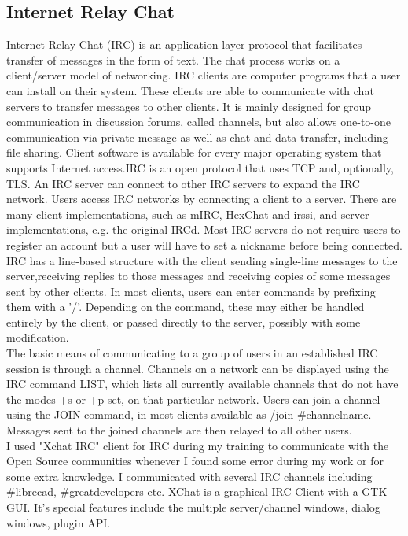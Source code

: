 \subsection{Internet Relay Chat}
Internet Relay Chat (IRC) is an application layer protocol that facilitates transfer of messages in the form of text. The chat process works on a client/server model of networking. IRC clients are computer programs that a user can install on their system. These clients are able to communicate with chat servers to transfer messages to other clients. It is mainly designed for group communication in discussion forums, called channels, but also allows one-to-one communication via private message as well as chat and data transfer, including file sharing.
Client software is available for every major operating system that supports Internet access.IRC is an open protocol that uses TCP and, optionally, TLS. An IRC server can connect to other IRC servers to expand the IRC network. Users access IRC networks by connecting a client to a server. There are many client implementations, such as mIRC, HexChat and irssi, and server implementations, e.g. the original IRCd. Most IRC servers do not require users to register an account but a user will have to set a nickname before being connected.\\

IRC has a line-based structure with the client sending single-line messages to the server,receiving replies to those messages and receiving copies of some messages sent by other clients. In most clients, users can enter commands by prefixing them with a '/'. Depending on the command, these may either be handled entirely by the client, or  passed directly to the server, possibly with some modification.\\

The basic means of communicating to a group of users in an established IRC session is through a channel. Channels on a network can be displayed using the IRC command LIST, which lists all currently available channels that do not have the modes +s or +p set, on that particular network.
Users can join a channel using the JOIN command, in most clients available as /join \#channelname. Messages sent to the joined channels are then relayed to all other users.\\

I used "Xchat IRC" client for IRC during my training to communicate with the Open Source communities whenever I found some error during my work or for some extra knowledge. I communicated with several IRC channels including \#librecad, \#greatdevelopers etc. XChat is a graphical IRC Client with a GTK+ GUI. It's special features include the multiple server/channel windows, dialog windows, plugin API.